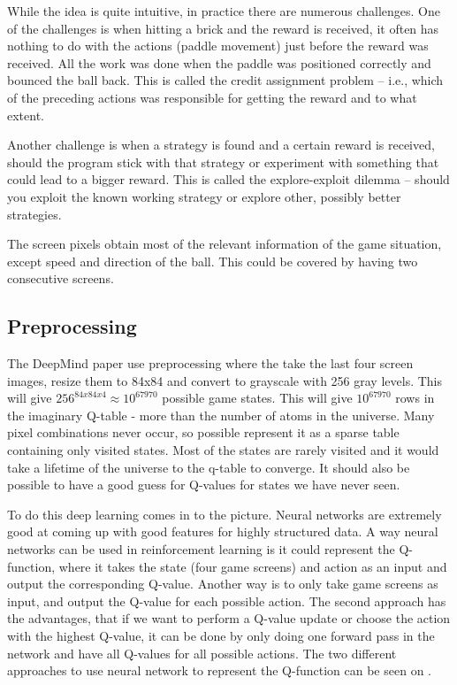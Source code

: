 While the idea is quite intuitive, in practice there are numerous challenges. One of the challenges is when hitting a brick and the reward is received, it often has nothing to do with the actions (paddle movement) just before the reward was received. All the work was done when the paddle was positioned correctly and bounced the ball back. This is called the credit assignment problem – i.e., which of the preceding actions was responsible for getting the reward and to what extent.

Another challenge is when a strategy is found and a certain reward is received, should the program stick with that strategy or experiment with something that could lead to a bigger reward. This is called the explore-exploit dilemma – should you exploit the known working strategy or explore other, possibly better strategies. 

The screen pixels obtain most of the relevant information of the game situation, except speed and direction of the ball. This could be covered by having two consecutive screens. 

\subsection{Preprocessing}
The DeepMind paper use preprocessing where the take the last four screen images, resize them to 84x84 and convert to grayscale with 256 gray levels. This will give $256^{84x84x4} \approx 10^{67970}$ possible game states. This will give $10^{67970}$ rows in the imaginary Q-table - more than the number of atoms in the universe. Many pixel combinations never occur, so possible represent it as a sparse table containing only visited states. Most of the states are rarely visited and it would take a lifetime of the universe to the q-table to converge. It should also be possible to have a good guess for Q-values for states we have never seen. 

To do this deep learning comes in to the picture. Neural networks are extremely good at coming up with good features for highly structured data. A way neural networks can be used in reinforcement learning is it could represent the Q-function, where it takes the state (four game screens) and action as an input and output the corresponding Q-value. Another way is to only take game screens as input, and output the Q-value for each possible action. The second approach has the advantages, that if we want to perform a Q-value update or choose the action with the highest Q-value, it can be done by only doing one forward pass in the network and have all Q-values for all possible actions. The two different approaches to use neural network to represent the Q-function can be seen on .              


